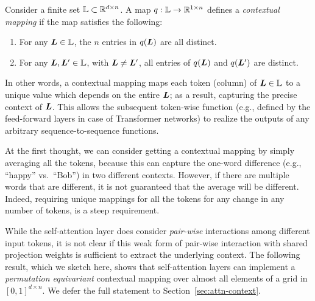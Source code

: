 

\begin{definition}
\label{def:context-mapping}
Consider a finite set ${\mathbb{L}} \subset \mathbb{R}^{d \times n}$.
A map $q: {\mathbb{L}} \to \mathbb{R}^{1 \times n}$ defines a {\em contextual mapping} if the map satisfies the following:
\begin{enumerate}[\hspace{5pt}1.]
\setlength{\itemsep}{-3pt}
    \item For any ${\bm{L}} \in {\mathbb{L}}$, the $n$ entries in $q({\bm{L}})$ are all distinct.
    \item For any ${\bm{L}}, {\bm{L}}' \in {\mathbb{L}}$, with ${\bm{L}} \neq {\bm{L}}'$, all entries of $q({\bm{L}})$ and $q({\bm{L}}')$ are distinct.
\end{enumerate}
\end{definition}
In other words, a contextual mapping maps each token (column) of ${\bm{L}} \in {\mathbb{L}}$ to a unique value which depends on the entire ${\bm{L}}$; as a result, capturing the precise context of ${\bm{L}}$. This allows the subsequent token-wise function (e.g., defined by the feed-forward layers in case of Transformer networks) to realize the outputs of any arbitrary sequence-to-sequence functions. 

At the first thought, we can consider getting a contextual mapping by simply averaging all the tokens, because this can capture the one-word difference (e.g., ``happy'' vs.\ ``Bob'') in two different contexts. However, if there are multiple words that are different, it is not guaranteed that the average will be different. Indeed, requiring unique mappings for all the tokens for any change in any number of tokens, is a steep requirement. 

While the self-attention layer does consider {\em pair-wise} interactions among different input tokens, it is not clear if this weak form of pair-wise interaction with shared projection weights is sufficient to extract the underlying context. The following result, which we sketch here, shows that self-attention layers can implement a \emph{permutation equivariant} contextual mapping over almost all elements of a grid in $[0,1]^{d \times n}$. We defer the full statement to Section~\ref{sec:attn-context}.

